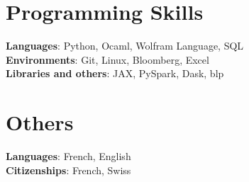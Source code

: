 \documentclass[letterpaper,10pt]{article}
\begin{document}
\section{Programming Skills}
\begin{itemize}[leftmargin=0.15in, label={}]
\small{\item{
\textbf{Languages}{: Python, Ocaml, Wolfram Language, SQL} \\
\textbf{Environments}{: Git, Linux, Bloomberg, Excel}\\
\textbf{Libraries and others}{: JAX, PySpark, Dask, blp}

}}
\end{itemize}
\section{Others}
\begin{itemize}[leftmargin=0.15in, label={}]
\small{\item{
\textbf{Languages}{: French, English} \\
\textbf{Citizenships}{: French, Swiss}\\
}}
\end{itemize}
\end{document}

